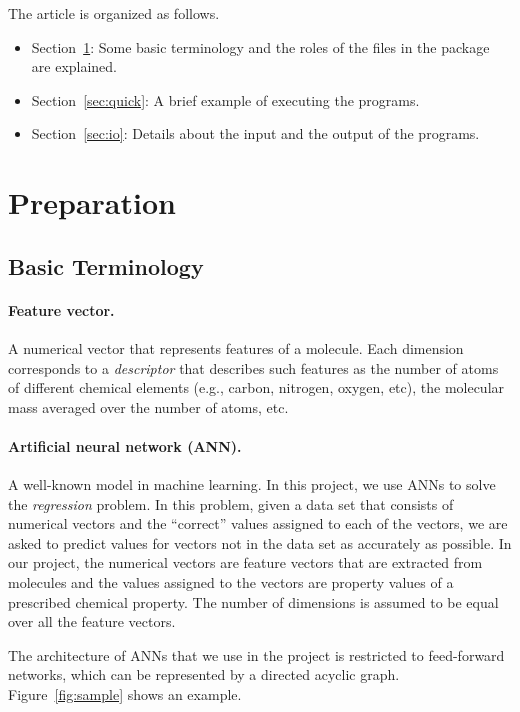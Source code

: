 \documentclass[11pt,titlepage,dvipdfmx,twoside]{book}
\newcommand{\secref}[1]{Section~\ref{sec:#1}}
\newcommand{\figref}[1]{Figure~\ref{fig:#1}}
\begin{document}
The article is organized as follows. 
\begin{itemize}
\item \secref{preparation}: 
Some basic terminology and the roles of the files in the package are explained. 
%
\item \secref{quick}: 
A brief example of executing the programs. 
%
\item \secref{io}: Details about the input and the output of the programs. 
\end{itemize}

\newpage
\section{Preparation}
\label{sec:preparation}

\subsection{Basic Terminology}
\paragraph{Feature vector.}
A numerical vector that represents features of a molecule.
Each dimension corresponds to a {\em descriptor} that describes
such features as the number of atoms of different 
chemical elements (e.g., carbon, nitrogen, oxygen, etc), the molecular mass
averaged over the number of atoms, etc.

\paragraph{Artificial neural network (ANN).}
A well-known model in machine learning.
In this project, we use ANNs to solve the {\em regression} problem.
In this problem, given a data set that consists of numerical vectors
and the ``correct'' values assigned to each of the vectors,
we are asked to predict values for vectors not in the data set
as accurately as possible.
In our project, the numerical vectors are feature vectors
that are extracted from molecules
and the values assigned to the vectors are property values
of a prescribed chemical property.
The number of dimensions is assumed to be equal
over all the feature vectors. 

The architecture of ANNs that we use in the project
is restricted to feed-forward networks, which can be represented by
a directed acyclic graph. \figref{sample} shows an example. 
\end{document}
